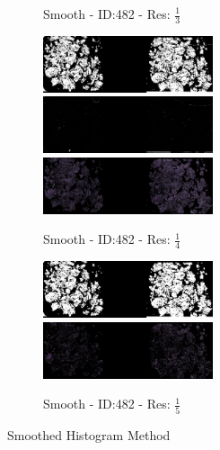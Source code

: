 \documentclass[letterpaper,10pt,oneside]{article}
\begin{document}
\begin{figure}[hbtp]
\begin{subfigure}[b]{5cm}
    \caption{Smooth - ID:482 - Res: $\frac{1}{3}$}
  \end{subfigure}
  \begin{subfigure}[b]{5cm}
    \includegraphics[width=5cm]{visualization/results/smoothhistogram/res_reduce_4/Region_0_PO14-00482B3_1_2_201404171123.png}
    \includegraphics[width=5cm]{visualization/results/smoothhistogram/res_reduce_4/Region_1_PO14-00482B3_1_2_201404171123.png}
    \includegraphics[width=5cm]{visualization/results/smoothhistogram/res_reduce_4/Region_2_PO14-00482B3_1_2_201404171123.png}
    \caption{Smooth - ID:482 - Res: $\frac{1}{4}$}
  \end{subfigure}
  \begin{subfigure}[b]{5cm}
    \includegraphics[width=5cm]{visualization/results/smoothhistogram/res_reduce_5/Region_0_PO14-00482B3_1_2_201404171123.png}
    \includegraphics[width=5cm]{visualization/results/smoothhistogram/res_reduce_5/Region_1_PO14-00482B3_1_2_201404171123.png}
    \caption{Smooth - ID:482 - Res: $\frac{1}{5}$}
  \end{subfigure}
  \caption{Smoothed Histogram Method}
  \label{fig:smoothhistseg}
\end{figure}
\end{document}

